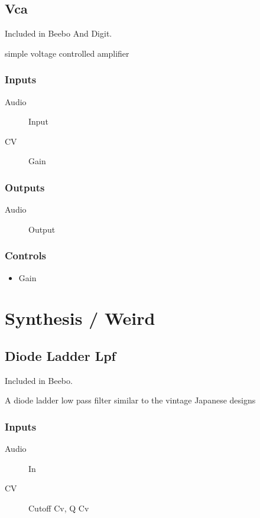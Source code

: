\subsection{Vca}

Included in Beebo And Digit.

simple voltage controlled amplifier



\subsubsection{Inputs}
\begin{description}
\item [Audio] Input
\item [CV] Gain
\end{description}

\subsubsection{Outputs}
\begin{description}
\item [Audio] Output
\end{description}

\subsubsection{Controls}
\begin{itemize}
\item Gain
\end{itemize}

\section{Synthesis / Weird}

\subsection{Diode Ladder Lpf}

Included in Beebo.

A diode ladder low pass filter similar to the vintage Japanese designs



\subsubsection{Inputs}
\begin{description}
\item [Audio] In
\item [CV] Cutoff Cv, Q Cv
\end{description}

